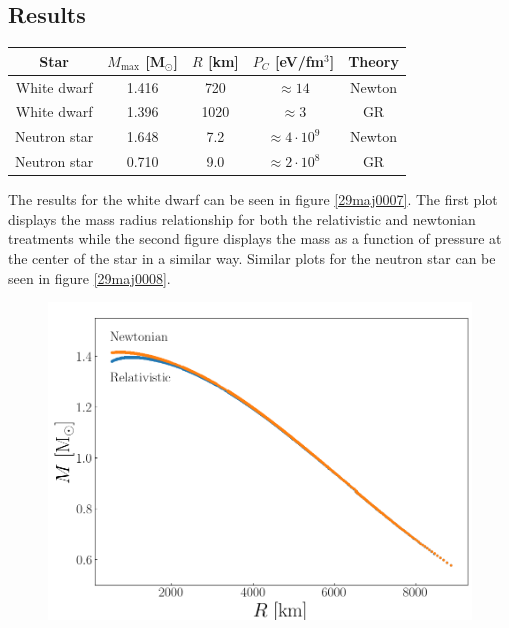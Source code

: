 \documentclass[twocolumn]{article}
\begin{document}
\begin{large}
\subsection*{Results}
\begin{table}[b]
\centering
\begin{tabular}{c c c c c}
    Star & $M_\text{max}$ [M$_\odot$] & $R$ [km] & $P_C$ [eV/fm$^3$] & Theory \\ 
    \hline\hline
    White dwarf  & 1.416 & 720  & $\approx 14$           & Newton \\ 
    White dwarf  & 1.396 & 1020 & $\approx 3$            & GR \\ 
    Neutron star & 1.648 & 7.2  & $\approx 4\cdot 10^9$  &Newton \\ 
    Neutron star & 0.710 & 9.0  & $\approx 2\cdot 10^8$  & GR \\ 
\end{tabular}
\end{table}
The results for the white dwarf can be seen in figure \ref{29maj0007}. The first plot displays the mass radius relationship for both the relativistic and newtonian treatments while the second figure displays the mass as a function of pressure at the center of the star in a similar way. Similar plots for the neutron star can be seen in figure \ref{29maj0008}.
\begin{figure}[!t]
    \begin{center}
        \includegraphics[scale=0.35]{WhiteDwarf_MR.png}

\end{center}
\end{figure}
\end{large}
\end{document}
